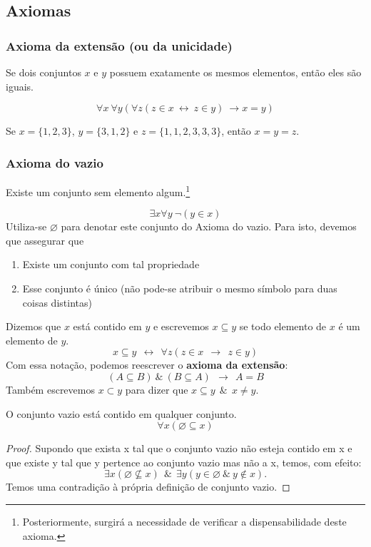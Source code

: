\subsection{Axiomas}
\subsubsection{Axioma da extensão (ou da unicidade)}
\begin{stat}
    Se dois conjuntos $x$ e $y$ possuem exatamente os mesmos elementos, então eles são iguais.
\end{stat}
    $$\forall x\ \forall y (\forall z (z \in x\ \leftrightarrow \ z \in y)\ \rightarrow x = y)$$
    \begin{exmp}
        Se $x = \{1, 2, 3\}$, $y = \{3,1,2\}$ e $z = \{1,1,2,3,3,3\}$, então $x = y = z$.
    \end{exmp}
\subsubsection{Axioma do vazio}
\begin{stat}
    Existe um conjunto sem elemento algum.\footnote[2]{Posteriormente, surgirá a necessidade de verificar a dispensabilidade deste axioma.}
\end{stat}    
    $$\exists x \forall y\ \neg(y \in x)$$
Utiliza-se $\varnothing$ para denotar este conjunto do Axioma do vazio. Para isto, devemos que assegurar que
\begin{enumerate}
    \item Existe um conjunto com tal propriedade
    \item Esse conjunto é único (não pode-se atribuir o mesmo símbolo para duas coisas distintas)
\end{enumerate}
    \begin{definition}
        Dizemos que $x$ está contido em $y$ e escrevemos $x \subseteq y$ se todo elemento de $x$ é um elemento de $y$. 
        $$ x \subseteq y\ \ \leftrightarrow\ \ \forall z (z \in x\ \ \rightarrow\ \ z \in y)$$
        Com essa notação, podemos reescrever o \textbf{axioma da extensão}: $$(A \subseteq B)\ \&\ (B \subseteq A)\ \ \rightarrow\ \ A = B$$
        Também escrevemos $x \subset y$ para dizer que $x \subseteq y\ \ \&\ \ x \neq y$.
    \end{definition}
\begin{theorem}\label{T1}
    O conjunto vazio está contido em qualquer conjunto.
    $$\forall x (\varnothing \subseteq x)$$
\end{theorem}
\begin{proof}
  Supondo que exista x tal que o conjunto vazio não esteja contido em x e que existe y tal que y pertence ao conjunto vazio mas não a x, temos, com efeito: 
  $$\exists x(\varnothing \nsubseteq x)\ \ \&\ \ \exists y(y \in \varnothing\ \&\ y \notin x).$$
Temos uma contradição à própria definição de conjunto vazio.
\end{proof}

